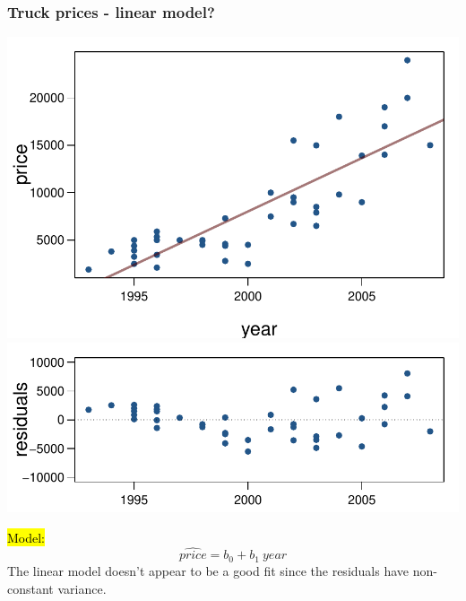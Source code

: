 \documentclass[slidestop,compress,mathserif,12pt,t,professionalfonts,xcolor=table]{beamer}
\begin{document}

\begin{frame}
\frametitle{Truck prices - linear model?}

\vspace{-0.25cm}

{
\begin{center}
\includegraphics[width=\textwidth]{figures/pickup/pu_price_year_scat} \\
\includegraphics[width=\textwidth]{figures/pickup/pu_price_year_res}
\end{center}
}
{
\hl{Model:} \[ \widehat{price} = b_0 + b_1~year \]
\pause
The linear model doesn't appear to be a good fit since the residuals have non-constant variance. \\
}

\end{frame}

\end{document}
